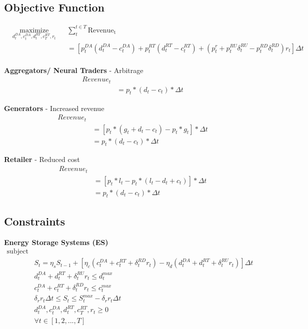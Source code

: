 \documentclass[a4paper,11pt,twoside,onecolumn]{book}
\begin{document}
\subsection{Objective Function}

\begin{equation*}
\begin{aligned}
& \underset{d_t^{DA}, c_t^{DA}, d_t^{RT}, c_T^{RT}, r_t}{\text{maximize}}
& & \sum_t^{t \in T} \mathrm{Revenue_t} \\
& & &= [p_t^{DA} (d_t^{DA}-c_t^{DA}) + p_t^{RT} (d_t^{RT}-c_t^{RT}) + (p_t^r+p_t^{RU} \delta_t^{RU}-p_t^{RD} \delta_t^{RD}) r_t] \Delta t \\
\end{aligned}
\end{equation*}


\textbf{Aggregators/ Neural Traders} - Arbitrage
\begin{equation*}
\begin{aligned}
&Revenue_t \\
& & = p_t * (d_t-c_t) * \Delta t
\end{aligned}
\end{equation*}

\textbf{Generators}  - Increased revenue
\begin{equation*}
\begin{aligned}
&Revenue_t \\
& & = [p_t * (g_t+d_t-c_t) - p_t*g_t]* \Delta t \\
& & = p_t * (d_t-c_t) * \Delta t
\end{aligned}
\end{equation*}

\textbf{Retailer} - Reduced cost
\begin{equation*}
\begin{aligned}
&Revenue_t \\
& & = [p_t*l_t - p_t * (l_t-d_t+c_t) ]* \Delta t \\
& & = p_t * (d_t-c_t) * \Delta t
\end{aligned}
\end{equation*}

\subsection{Constraints}
\textbf{Energy Storage Systems (ES)}
\begin{equation*}
\begin{aligned}
\text{subject to} &  \\
& S_t = \eta_s S_{t-1} + [\eta_c(c_t^{DA}+c_t^{RT}+\delta^{RD}_t r_t)  - \eta_d(d_t^{DA}+d_t^{RT}+\delta^{RU}_t r_t)]\Delta t  \\
& d_t^{DA} + d_t^{RT} +\delta^{RU}_t r_t \leq d_t^{max} \\
& c_t^{DA} + c_t^{RT} +\delta^{RD}_t r_t \leq c_t^{max} \\
& \delta_r r_t \Delta t \leq S_t \leq S_t^{max} - \delta_r r_t \Delta t \\
& d_t^{DA}, c_t^{DA}, d_t^{RT}, c_T^{RT}, r_t \geq 0 \\
& \forall t \in [1, 2, ..., T]
\end{aligned}
\end{equation*}
\end{document}
